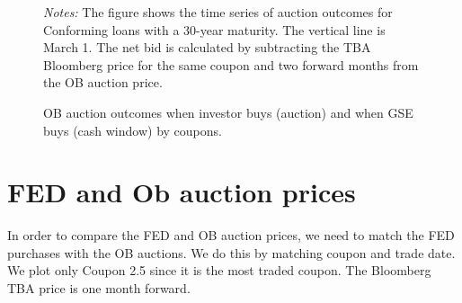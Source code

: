 \documentclass[11pt,a4paper]{article}
\begin{document}
\begin{figure}[]
   \caption{OB auction outcomes when investor buys (auction) and when GSE buys (cash window) by coupons. } 
   \begin{minipage}{\textwidth}
      \footnotesize{\textit{Notes:} The figure shows the time series of auction outcomes for Conforming loans with a 30-year maturity.  The vertical line is March 1. The net bid is calculated by subtracting the TBA Bloomberg price for the same coupon and two forward months from the OB auction price. }
      \end{minipage}
\end{figure}


\pagebreak
  \section{FED and Ob auction prices}

  In order to compare the FED and OB auction prices, we need to match the FED purchases with the OB auctions. We do this by matching coupon and trade date. We plot only Coupon 2.5 since it is the most traded coupon. The Bloomberg TBA price is one month forward.
\end{document}
